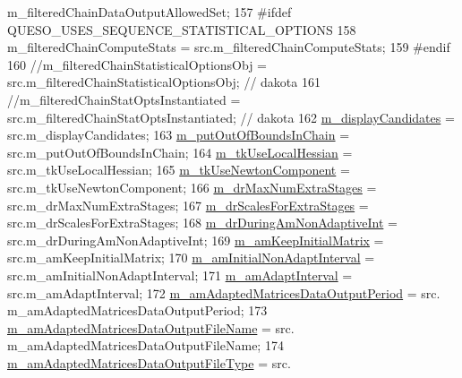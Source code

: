 \begin{DoxyCode}
      m\_filteredChainDataOutputAllowedSet;
157 \textcolor{preprocessor}{#ifdef QUESO\_USES\_SEQUENCE\_STATISTICAL\_OPTIONS}
158 \textcolor{preprocessor}{}  m\_filteredChainComputeStats                 = src.m\_filteredChainComputeStats;
159 \textcolor{preprocessor}{#endif}
160 \textcolor{preprocessor}{}\textcolor{comment}{//m\_filteredChainStatisticalOptionsObj        = src.m\_filteredChainStatisticalOptionsObj; // dakota}
161 \textcolor{comment}{//m\_filteredChainStatOptsInstantiated         = src.m\_filteredChainStatOptsInstantiated; // dakota}
162   \hyperlink{class_q_u_e_s_o_1_1_mh_options_values_a1df386cecfd87745e4d8adfb472d3443}{m\_displayCandidates}                         = src.m\_displayCandidates;
163   \hyperlink{class_q_u_e_s_o_1_1_mh_options_values_a6500d388ce724964ed858174a454177a}{m\_putOutOfBoundsInChain}                     = src.m\_putOutOfBoundsInChain;
164   \hyperlink{class_q_u_e_s_o_1_1_mh_options_values_a3fa3d465b07ea276e7b2aa68b897e4ec}{m\_tkUseLocalHessian}                         = src.m\_tkUseLocalHessian;
165   \hyperlink{class_q_u_e_s_o_1_1_mh_options_values_ae4fcf242f3d9e216c17d057faf6939c3}{m\_tkUseNewtonComponent}                      = src.m\_tkUseNewtonComponent;
166   \hyperlink{class_q_u_e_s_o_1_1_mh_options_values_ab72acd4e4b80dd5c3a4b361466474f21}{m\_drMaxNumExtraStages}                       = src.m\_drMaxNumExtraStages;
167   \hyperlink{class_q_u_e_s_o_1_1_mh_options_values_a37774da61eda0aaa92dbcc417944b2e2}{m\_drScalesForExtraStages}                    = src.m\_drScalesForExtraStages;
168   \hyperlink{class_q_u_e_s_o_1_1_mh_options_values_ab546a17967c0690d0c01730f63ccb70b}{m\_drDuringAmNonAdaptiveInt}                  = src.m\_drDuringAmNonAdaptiveInt;
169   \hyperlink{class_q_u_e_s_o_1_1_mh_options_values_a65b54138ec13a04d67a75a03f6300132}{m\_amKeepInitialMatrix}                       = src.m\_amKeepInitialMatrix;
170   \hyperlink{class_q_u_e_s_o_1_1_mh_options_values_a3e72af53780ce9420c3454b00f56bc11}{m\_amInitialNonAdaptInterval}                 = src.m\_amInitialNonAdaptInterval;
171   \hyperlink{class_q_u_e_s_o_1_1_mh_options_values_a5cda43f7f5361c56eab4c036c9bcab5d}{m\_amAdaptInterval}                           = src.m\_amAdaptInterval;
172   \hyperlink{class_q_u_e_s_o_1_1_mh_options_values_a9e9de50014cce9683774d42119a1b752}{m\_amAdaptedMatricesDataOutputPeriod}         = src.
      m\_amAdaptedMatricesDataOutputPeriod;
173   \hyperlink{class_q_u_e_s_o_1_1_mh_options_values_ad131a1b5617e040b7602fbd6bf4a600e}{m\_amAdaptedMatricesDataOutputFileName}       = src.
      m\_amAdaptedMatricesDataOutputFileName;
174   \hyperlink{class_q_u_e_s_o_1_1_mh_options_values_a2aeb0e38d87c86464af4bde6a202598a}{m\_amAdaptedMatricesDataOutputFileType}       = src.

\end{DoxyCode}
